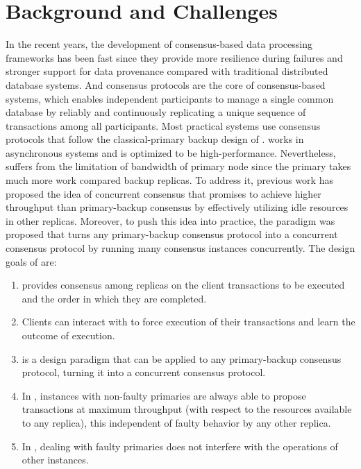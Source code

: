 \section{Background and Challenges}
In the recent years, the development of consensus-based data processing frameworks \cite{pbft, bitcoin, ethereum} has been fast 
since they provide more resilience during failures and stronger support for data provenance compared with traditional 
distributed database systems. And consensus protocols are the core of consensus-based systems, 
which enables independent participants to manage a single common database by reliably and continuously 
replicating a unique sequence of transactions among all participants. Most practical systems use 
consensus protocols that follow the classical-primary backup design of \PBFT{}. \PBFT{} works in asynchronous 
systems and is optimized to be high-performance. Nevertheless, \PBFT{} suffers 
from the limitation of bandwidth of primary node since the primary takes much more work compared backup replicas. 
To address it, previous work has proposed the idea of concurrent consensus that promises to achieve higher throughput 
than primary-backup consensus by effectively utilizing idle resources in other replicas. Moreover, to 
push this idea into practice, the \RCC{} paradigm was proposed that turns any 
primary-backup consensus protocol into a concurrent consensus protocol by running many consensus 
instances concurrently. The design goals of \RCC{} \cite{rcc} are:
\begin{enumerate}
    \item  \RCC{} provides consensus among replicas on the client transactions to be executed and the order in which they are completed.
    \item  Clients can interact with \RCC{} to force execution of their transactions and learn the outcome of execution.
    \item  \RCC{} is a design paradigm that can be applied to any primary-backup consensus protocol, turning it into a concurrent consensus protocol.
    \item  In \RCC{}, instances with non-faulty primaries are always able to propose transactions at maximum throughput (with respect to the resources available to any replica), this independent of faulty behavior by any other replica.
    \item  In \RCC{}, dealing with faulty primaries does not interfere with the operations of other instances.
\end{enumerate}

